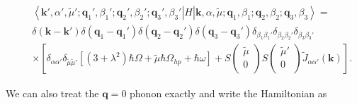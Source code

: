 \documentclass[pt12]{article}
\newcommand{\bfk}{\mathbf{k}}
\newcommand{\bfq}{\mathbf{q}}
\newcommand{\tmu}{\tilde{\mu}}
\begin{document}
\begin{eqnarray}\label{4P_H_4P}
&& \left< \bfk',\alpha',\tmu'; \bfq_1',\beta_1' ; \bfq_2',\beta_2';
\bfq_3',\beta_3' \right| H \left|\bfk,\alpha,\tmu;
\bfq_1,\beta_1 ; \bfq_2,\beta_2; \bfq_3,\beta_3 \right> = \\
\nonumber && \delta (\bfk-\bfk') \delta (\bfq_1-\bfq_1')
\delta(\bfq_2-\bfq_2') \delta(\bfq_3-\bfq_3')
\delta_{\beta_1\beta_1'} \delta_{\beta_2\beta_2'}
\delta_{\beta_3\beta_3'} \\ \nonumber && \times
\left[\delta_{\alpha\alpha'} \delta_{\tmu\tmu'} \left[ \left( 3 +
\lambda^2 \right) \hbar \Omega + \tmu \hbar \Omega_{hp}+\hbar \omega
\right] + S\left(
                                \begin{array}{c}
                                    \tmu \\
                                    0 \\
                                  \end{array}
                                \right)
S\left(
                                \begin{array}{c}
                                    \tmu' \\
                                    0 \\
                                  \end{array}
                                \right)
\tilde{J}_{\alpha\alpha'}(\bfk)\right].
\end{eqnarray}

We can also treat the $\bfq=0$ phonon exactly and write the
Hamiltonian as
\end{document}

